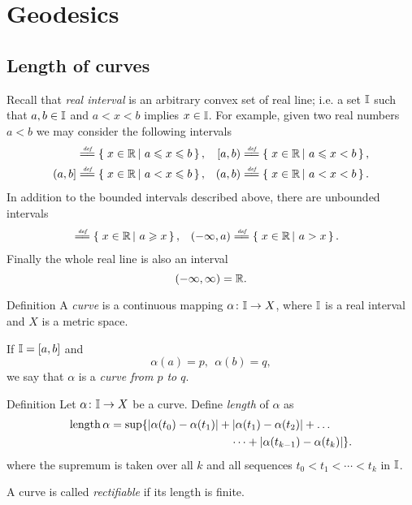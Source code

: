 \chapter{Geodesics}\label{chap:length}
\section{Length of curves}

Recall that \emph{real interval} is an arbitrary convex set of real line;
i.e. a set $\mathbb{I}$ such that $a,b\in \mathbb{I}$ and $a<x<b$ implies $x\in\mathbb{I}$.
For example, given two real numbers $a<b$ we may consider the following intervals
\begin{align*}
[a,b]
&\df
\set{x\in \RR}{a\le x\le b},
&
[a,b)
&\df
\set{x\in \RR}{a\le x< b},
\\
(a,b]
&\df
\set{x\in \RR}{a< x\le b},
&
(a,b)
&\df
\set{x\in \RR}{a< x< b}.
\end{align*}
In addition to the bounded intervals described above, there are unbounded intervals
\begin{align*}
[a,\infty)
&\df
\set{x\in \RR}{a\le x},
&
(a,\infty)
&\df
\set{x\in \RR}{a< x},
\\
(-\infty,a]
&\df
\set{x\in \RR}{a\ge x},
&
(-\infty,a)
&\df
\set{x\in \RR}{a> x}.
\end{align*}
Finally the whole real line is also an interval
$$(-\infty,\infty)=\mathbb{R}.$$

\begin{thm}{Definition}\label{def:curve}
A \emph{curve} is a continuous mapping $\alpha\colon\mathbb{I}\to X$,
where $\mathbb{I}$ is a real interval and $X$ is a metric space. 

If $\mathbb{I}=[a,b]$ and $$\alpha(a)=p,\ \ \alpha(b)=q,$$
we say that $\alpha$ is a \emph{curve from $p$ to $q$}.
\end{thm}

\begin{thm}{Definition}\label{def:length}
Let $\alpha\colon\mathbb{I}\to X$ be a curve. Define \emph{length} of $\alpha$ as
\begin{align*}
\length \alpha
&= 
\sup \{|\alpha(t_0)-\alpha(t_1)|+|\alpha(t_1)-\alpha(t_2)|+\dots
\\
&\ \ \ \ \ \ \ \ \ \ \ \ \ \ \ \ \ \ \ \ \ \ \ \ \ \ \ \ \ \ \ \ \dots+|\alpha(t_{k-1})-\alpha(t_k)|\}. 
\end{align*}
where the supremum is taken over all $k$ and all sequences $t_0 < t_1 < \cdots < t_k$ in $\mathbb{I}$.

A curve is called \emph{rectifiable} if its length is finite.
\end{thm}

